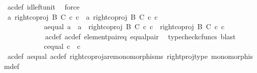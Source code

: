 \begin{isabellebody}
\ a{\isacharprime}{\kern0pt}c{\isacharprime}{\kern0pt}{\isacharunderscore}{\kern0pt}def\ id{\isacharunderscore}{\kern0pt}left{\isacharunderscore}{\kern0pt}unit{}\ \isamarkupfalse%
\ force\isanewline
\ \ \ \ \ \ \ \ \ \ \isamarkupfalse%
\ \isamarkupfalse%
\ {\isachardoublequoteopen}{\isasymlangle}a{\isacharcomma}{\kern0pt}\ right{\isacharunderscore}{\kern0pt}coproj\ B\ C\ {\isasymcirc}\isactrlsub c\ c{\isasymrangle}\ {\isacharequal}{\kern0pt}\ {\isasymlangle}a{\isacharprime}{\kern0pt}{\isacharcomma}{\kern0pt}\ right{\isacharunderscore}{\kern0pt}coproj\ B\ C\ {\isasymcirc}\isactrlsub c\ c{\isacharprime}{\kern0pt}{\isasymrangle}{\isachardoublequoteclose}\isacommand{{\isachardot}{\kern0pt}}\isamarkupfalse%
\ \ \ \ \ \ \ \ \ \ \ \ \isanewline
\ \ \ \ \ \ \ \ \isamarkupfalse%
\ \ \ \ \ \isanewline
\ \ \ \ \ \ \ \ \isamarkupfalse%
\ \isamarkupfalse%
\ a{\isacharunderscore}{\kern0pt}equal{\isacharcolon}{\kern0pt}\ {\isachardoublequoteopen}a\ {\isacharequal}{\kern0pt}\ a{\isacharprime}{\kern0pt}\ {\isasymand}\ right{\isacharunderscore}{\kern0pt}coproj\ B\ C\ {\isasymcirc}\isactrlsub c\ c\ {\isacharequal}{\kern0pt}\ right{\isacharunderscore}{\kern0pt}coproj\ B\ C\ {\isasymcirc}\isactrlsub c\ c{\isacharprime}{\kern0pt}{\isachardoublequoteclose}\isanewline
\ \ \ \ \ \ \ \ \ \ \isamarkupfalse%
\ a{\isacharprime}{\kern0pt}c{\isacharprime}{\kern0pt}{\isacharunderscore}{\kern0pt}def\ ac{\isacharunderscore}{\kern0pt}def\ element{\isacharunderscore}{\kern0pt}pair{\isacharunderscore}{\kern0pt}eq\ equal{\isacharunderscore}{\kern0pt}pair\ \isamarkupfalse%
\ {\isacharparenleft}{\kern0pt}typecheck{\isacharunderscore}{\kern0pt}cfuncs{\isacharcomma}{\kern0pt}\ blast{\isacharparenright}{\kern0pt}\isanewline
\ \ \ \ \ \ \ \ \isamarkupfalse%
\ \isamarkupfalse%
\ c{\isacharunderscore}{\kern0pt}equal{\isacharcolon}{\kern0pt}\ {\isachardoublequoteopen}c\ {\isacharequal}{\kern0pt}\ c{\isacharprime}{\kern0pt}{\isachardoublequoteclose}\ \isanewline
\ \ \ \ \ \ \ \ \ \ \isamarkupfalse%
\ a{\isacharprime}{\kern0pt}c{\isacharprime}{\kern0pt}{\isacharunderscore}{\kern0pt}def\ a{\isacharunderscore}{\kern0pt}equal\ ac{\isacharunderscore}{\kern0pt}def\ right{\isacharunderscore}{\kern0pt}coproj{\isacharunderscore}{\kern0pt}are{\isacharunderscore}{\kern0pt}monomorphisms\ right{\isacharunderscore}{\kern0pt}proj{\isacharunderscore}{\kern0pt}type\ monomorphism{\isacharunderscore}{\kern0pt}def{}\ \isamarkupfalse%

\end{isabellebody}

